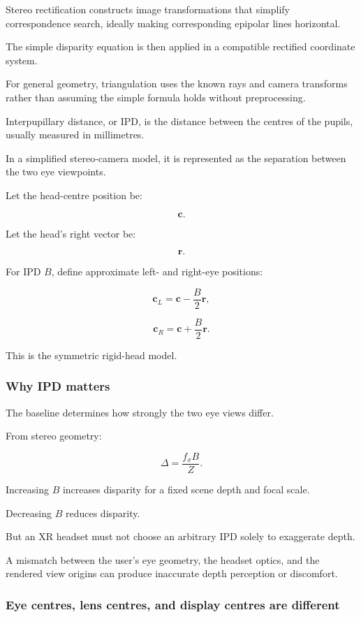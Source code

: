 Stereo rectification constructs image transformations that simplify correspondence search, ideally making corresponding epipolar lines horizontal.

The simple disparity equation is then applied in a compatible rectified coordinate system.

For general geometry, triangulation uses the known rays and camera transforms rather than assuming the simple formula holds without preprocessing.

Interpupillary distance, or IPD, is the distance between the centres of the pupils, usually measured in millimetres.

In a simplified stereo-camera model, it is represented as the separation between the two eye viewpoints.

Let the head-centre position be:

\[ \mathbf c. \]

Let the head's right vector be:

\[ \mathbf r. \]

For IPD \(B\), define approximate left- and right-eye positions:

\[ \boxed{ \mathbf c_L=\mathbf c-\frac B2\mathbf r, } \]

\[ \boxed{ \mathbf c_R=\mathbf c+\frac B2\mathbf r. } \]

This is the symmetric rigid-head model.

\subsubsection{Why IPD matters}\label{why-ipd-matters}

The baseline determines how strongly the two eye views differ.

From stereo geometry:

\[ \Delta=\frac{f_xB}{Z}. \]

Increasing \(B\) increases disparity for a fixed scene depth and focal scale.

Decreasing \(B\) reduces disparity.

But an XR headset must not choose an arbitrary IPD solely to exaggerate depth.

A mismatch between the user's eye geometry, the headset optics, and the rendered view origins can produce inaccurate depth perception or discomfort.

\subsubsection{Eye centres, lens centres, and display centres are different}\label{eye-centres-lens-centres-and-display-centres-are-different}

